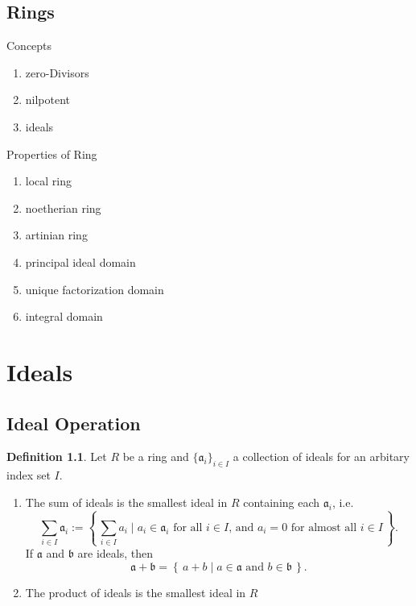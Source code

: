 \documentclass{book}
\theoremstyle{plain}
\theoremstyle{definition}
\theoremstyle{custom_definition}
\newtheorem{definition}[thm]{Definition}
\newcommand{\makeset}[2]{\left\{\, #1 \mathrel{\mid} #2 \,\right\}}
\begin{document}
\chapter{Rings}

Concepts
\begin{enumerate}
    \item zero-Divisors
    \item nilpotent
    \item ideals
\end{enumerate}

Properties of Ring
\begin{enumerate}
    \item local ring
    \item noetherian ring
    \item artinian ring
    \item principal ideal domain
    \item unique factorization domain
    \item integral domain
\end{enumerate}

\part{Ideals}
\chapter{Ideal Operation}
\begin{definition}
    Let \(R\) be a ring and \(\{\mathfrak{a}_i\}_{i \in I}\) a collection of ideals for an arbitary index set \(I\).
    \begin{enumerate}
        \item The sum of ideals is the smallest ideal in \(R\) containing each \(\mathfrak{a}_i\), i.e.
        \begin{equation}
            \sum_{i \in I} \mathfrak{a}_i := \makeset{\sum_{i \in I} a_i}{a_i \in \mathfrak{a}_i \text{ for all } i \in I \text{, and } a_i = 0 \text{ for almost all } i \in I} \text{.}
        \end{equation}
        If \(\mathfrak{a}\) and \(\mathfrak{b}\) are ideals, then
        \begin{equation}
            \mathfrak{a} + \mathfrak{b} = \makeset{a + b}{a \in \mathfrak{a} \text{ and } b \in \mathfrak{b}}\text{.}
        \end{equation}
        \item The product of ideals is the smallest ideal in \(R\)
    \end{enumerate}

\end{definition}
\end{document}
